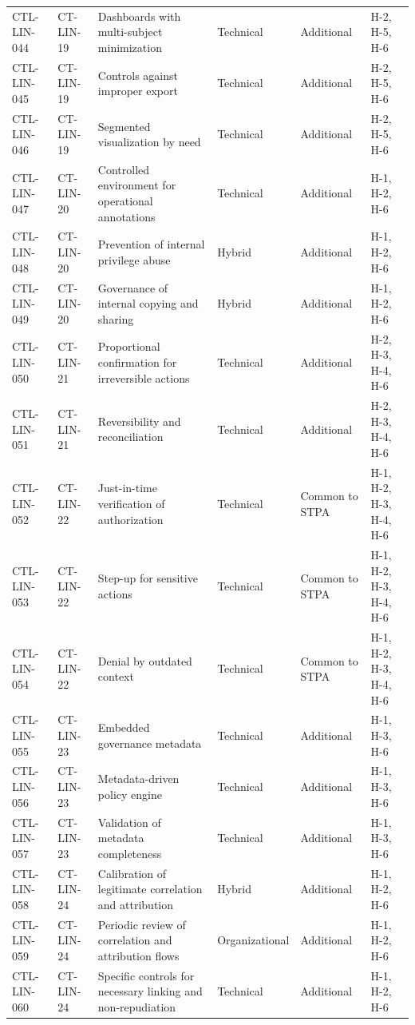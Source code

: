 \begin{footnotesize}
\begin{longtable}{l p{} p{} p{} p{} p{}}
        CTL-LIN-044 & CT-LIN-19 & Dashboards with multi-subject minimization & Technical & Additional & H-2, H-5, H-6 \\
        CTL-LIN-045 & CT-LIN-19 & Controls against improper export & Technical & Additional & H-2, H-5, H-6 \\
        CTL-LIN-046 & CT-LIN-19 & Segmented visualization by need & Technical & Additional & H-2, H-5, H-6 \\
        CTL-LIN-047 & CT-LIN-20 & Controlled environment for operational annotations & Technical & Additional & H-1, H-2, H-6 \\
        CTL-LIN-048 & CT-LIN-20 & Prevention of internal privilege abuse & Hybrid & Additional & H-1, H-2, H-6 \\
        CTL-LIN-049 & CT-LIN-20 & Governance of internal copying and sharing & Hybrid & Additional & H-1, H-2, H-6 \\
        CTL-LIN-050 & CT-LIN-21 & Proportional confirmation for irreversible actions & Technical & Additional & H-2, H-3, H-4, H-6 \\
        CTL-LIN-051 & CT-LIN-21 & Reversibility and reconciliation & Technical & Additional & H-2, H-3, H-4, H-6 \\
        CTL-LIN-052 & CT-LIN-22 & Just-in-time verification of authorization & Technical & Common to STPA & H-1, H-2, H-3, H-4, H-6 \\
        CTL-LIN-053 & CT-LIN-22 & Step-up for sensitive actions & Technical & Common to STPA & H-1, H-2, H-3, H-4, H-6 \\
        CTL-LIN-054 & CT-LIN-22 & Denial by outdated context & Technical & Common to STPA & H-1, H-2, H-3, H-4, H-6 \\
        CTL-LIN-055 & CT-LIN-23 & Embedded governance metadata & Technical & Additional & H-1, H-3, H-6 \\
        CTL-LIN-056 & CT-LIN-23 & Metadata-driven policy engine & Technical & Additional & H-1, H-3, H-6 \\
        CTL-LIN-057 & CT-LIN-23 & Validation of metadata completeness & Technical & Additional & H-1, H-3, H-6 \\
        CTL-LIN-058 & CT-LIN-24 & Calibration of legitimate correlation and attribution & Hybrid & Additional & H-1, H-2, H-6 \\
        CTL-LIN-059 & CT-LIN-24 & Periodic review of correlation and attribution flows & Organizational & Additional & H-1, H-2, H-6 \\
        CTL-LIN-060 & CT-LIN-24 & Specific controls for necessary linking and non-repudiation & Technical & Additional & H-1, H-2, H-6 \\

\end{longtable}
\end{footnotesize}
